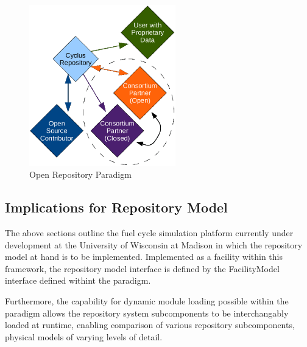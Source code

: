 
\begin{figure}[h]
  \begin{center}
    \includegraphics[height=7cm]{./chapters/paradigm/openness.eps}
  \end{center}
  \caption{\Cyclus Open Repository Paradigm}
  \label{fig:openness}
\end{figure}
\subsection{Implications for Repository Model}

The above sections outline the fuel cycle simulation platform
currently under development at the University of Wisconsin at
Madison in which the repository model at hand is to be implemented. 
Implemented as a facility within this framework, the repository model 
interface is defined by the FacilityModel interface defined withint 
the \Cyclus paradigm. 

Furthermore, the capability for dynamic module loading possible within 
the \Cyclus paradigm allows the repository system subcomponents to be 
interchangably loaded at runtime, enabling comparison of various 
repository subcomponents, physical models of varying levels of detail. 



